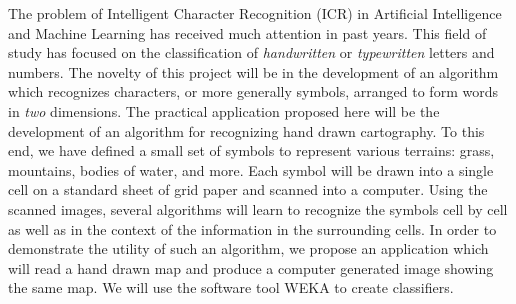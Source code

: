 
The problem of Intelligent Character Recognition (ICR) in Artificial
Intelligence and Machine Learning has received much attention in past years.
This field of study has focused on the classification of \emph{handwritten}  or
\emph{typewritten} letters and numbers.  The novelty of this project will be in
the development of an algorithm which recognizes characters, or more generally
symbols, arranged to form words in \emph{two} dimensions. The practical
application proposed here will be the development of an algorithm for
recognizing hand drawn cartography. To this end, we have defined a small set of
symbols to represent various terrains: grass, mountains, bodies of water, and
more. Each symbol will be drawn into a single cell on a standard sheet of grid
paper and scanned into a computer. Using the scanned images, several
algorithms will learn to recognize the symbols cell by cell as well as in the
context of the information in the surrounding cells. In order to demonstrate
the utility of such an algorithm, we propose an application which will read a
hand drawn map and produce a computer generated image showing the same map. We
will use the software tool WEKA\cite{hall2009} to create classifiers.

